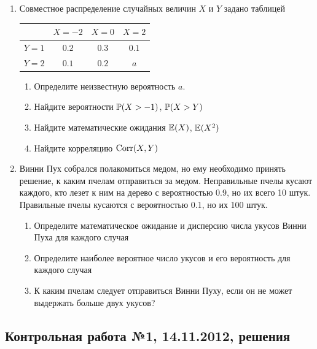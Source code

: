 \documentclass[12pt, a4paper]{article}\usepackage[]{graphicx}\usepackage[]{color}
\begin{document}
\begin{enumerate}
\item Совместное распределение случайных величин $X$ и $Y$ задано таблицей

\begin{tabular}{@{}c|ccc@{}}
\toprule
      & $X=-2$ & $X=0$ & $X=2$ \\ \midrule
$Y=1$ & $0.2$  & $0.3$ & $0.1$ \\
$Y=2$ & $0.1$  & $0.2$ & $a$   \\ \bottomrule
\end{tabular}

\begin{enumerate}
\item Определите неизвестную вероятность $a$.
\item Найдите вероятности $\P(X>-1)$, $\P(X>Y)$
\item Найдите математические ожидания $\E(X)$, $\E(X^2)$
\item Найдите корреляцию $\Corr(X,Y)$
\end{enumerate}

\item Винни Пух собрался полакомиться медом, но ему необходимо принять решение, к каким пчелам отправиться за медом. Неправильные пчелы кусают каждого, кто лезет к ним на дерево с вероятностью 0.9, но их всего 10 штук. Правильные пчелы кусаются с вероятностью 0.1, но их 100 штук.
\begin{enumerate}
\item  Определите математическое ожидание и дисперсию числа укусов Винни Пуха для каждого случая
\item Определите наиболее вероятное число укусов и его вероятность для каждого случая
\item К каким пчелам следует отправиться Винни Пуху, если он не может выдержать больше двух укусов?
\end{enumerate}
\end{enumerate}



\subsection{Контрольная работа №1, 14.11.2012, решения}
\end{document}
